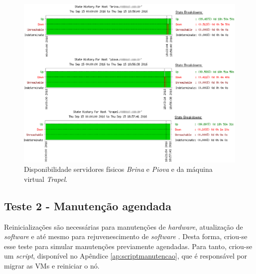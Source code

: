 \begin{figure}[h!]
 \centering
 \includegraphics[width=470px]{img/teste1_disponibilidade.eps}
 \caption{Disponibilidade servidores físicos \textit{Brina} e \textit{Piova} e da máquina virtual \textit{Trapel}.}
 \label{fig:teste1_disponibilidade}
\end{figure}


\subsection{Teste 2 - Manutenção agendada}

Reinicializações são necessárias para manutenções de \textit{hardware}, atualização de \textit{software} e até mesmo para rejuvenescimento de
\textit{software} \cite{melo2014}. Desta forma, criou-se esse teste para simular manutenções previamente agendadas. Para tanto, criou-se 
um \textit{script}, disponível no Apêndice \ref{ap:scriptmanutencao}, que é responsável por migrar as \acp{VM} e reiniciar o nó.


